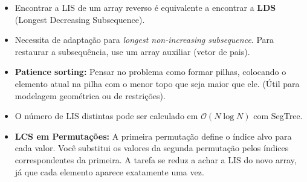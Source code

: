 \begin{itemize}
    \item Encontrar a LIS de um array reverso é equivalente a encontrar a \textbf{LDS} (Longest Decreasing Subsequence).
    \item Necessita de adaptação para \textit{longest non-increasing subsequence}. Para restaurar a subsequência, use um array auxiliar (vetor de pais).
    \item \textbf{Patience sorting:} Pensar no problema como formar pilhas, colocando o elemento atual na pilha com o menor topo que seja maior que ele. (Útil para modelagem geométrica ou de restrições).
    \item O número de LIS distintas pode ser calculado em $\mathcal{O}(N \log N)$ com SegTree.
    \item \textbf{LCS em Permutações:} A primeira permutação define o índice alvo para cada valor. Você substitui os valores da segunda permutação pelos índices correspondentes da primeira. A tarefa se reduz a achar a LIS do novo array, já que cada elemento aparece exatamente uma vez.
\end{itemize}